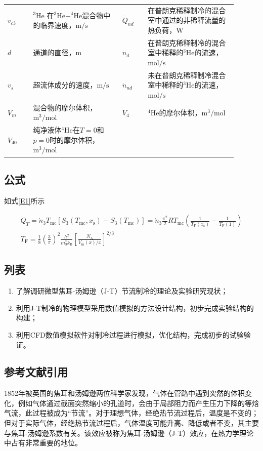 \begin{table}[!htbp]
\begin{tabular}{m{0.1\linewidth}m{0.35\linewidth}m{0.1\linewidth}m{0.35\linewidth}}
		$v_{c3}$ & $\mathrm{^3He}$ 在$\mathrm{^3He-^4He}$混合物中的临界速度，$\mathrm{m/s}$ & $\dot{Q}_{nd}$ & 在普朗克稀释制冷的混合室中通过的非稀释流量的热负荷，$\mathrm{W}$ \\
		$d$ & 通道的直径，$\mathrm{m}$ & $\dot{n}_d$ & 在普朗克稀释制冷的混合室中稀释的$\mathrm{^3He}$的流速，$\mathrm{mol/s}$ \\
		$v_s$ & 超流体成分的速度，$\mathrm{m/s}$ & $\dot{n}_{nd}$ & 未在普朗克稀释制冷混合室中稀释的$\mathrm{^3He}$的流速，$\mathrm{mol/s}$ \\ 
		$V_m$ & 混合物的摩尔体积，$\mathrm{m^3/mol}$ & $V_4$ & $\mathrm{^4He}$的摩尔体积，$\mathrm{m^3/mol}$ \\
		$V_{40}$ & 纯净液体$\mathrm{^4He}$在$T=0$和$p=0$时的摩尔体积，$\mathrm{m^3/mol}$ & & \\
		\bottomrule
	\end{tabular}	
\end{table}


\subsection{公式}

如式\eqref{E1}所示

\begin{gather}
	\dot{Q}_{T}=\dot{n}_{3} T_{\mathrm{mc}}\left[S_{3}\left(T_{\mathrm{mc}}, x_{\mathrm{s}}\right)-S_{3}\left(T_{\mathrm{mc}}\right)\right]=\dot{n}_{3} \frac{\pi^{2}}{2} R T_{\mathrm{mc}}\left(\frac{1}{T_{\mathrm{F}}\left(x_{\mathrm{s}}\right)}-\frac{1}{T_{\mathrm{F}}(1)}\right) \label{2E1} \\
	T_{\mathrm{F}}=\frac{1}{8}\left(\frac{3}{\pi}\right)^{2} \frac{h^{2}}{m_{3}^{*} k_{\mathrm{B}}}\left[\frac{N_{\mathrm{A}}}{V_{\mathrm{m}}(x) / x}\right]^{2 / 3} \label{E1}
\end{gather}

\subsection{列表}

\begin{enumerate}[label=(\arabic*)]
	\item 了解调研微型焦耳-汤姆逊（J-T）节流制冷的理论及实验研究现状；
	\item 利用J-T制冷的物理模型采用数值模拟的方法设计结构，初步完成实验结构的构建；
	\item 利用CFD数值模拟软件对制冷过程进行模拟，优化结构，完成初步的试验验证。
\end{enumerate}

\subsection{参考文献引用}

1852年被英国的焦耳和汤姆逊两位科学家发现，气体在管路中遇到突然的体积变化，例如气体通过截面突然缩小的孔道时，会由于局部阻力而产生压力下降的等焓气流，此过程被成为“节流”。对于理想气体，经绝热节流过程后，温度是不变的；但对于实际气体，经绝热节流过程后，气体温度可能升高、降低或者不变，其主要与焦耳-汤姆逊系数有关\cite{程阳2015气体静压节流器微流场焦耳}。该效应被称为焦耳-汤姆逊（J-T）效应，在热力学理论中占有非常重要的地位。

\newpage

